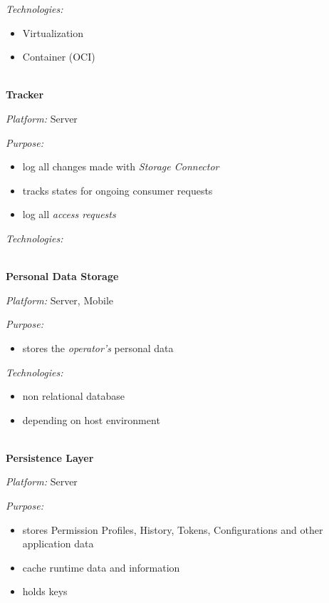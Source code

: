 \documentclass[12pt,english,a4paper,titlepage,cleardoublepage=empty,dottedtoc]{report}
\providecommand{\tightlist}{%
  \setlength{\itemsep}{0pt}\setlength{\parskip}{0pt}}
\begin{document}
\emph{Technologies:}

\begin{itemize}
\tightlist
\item
  Virtualization
\item
  Container (OCI)
\end{itemize}

~\\
\textbf{Tracker}

\emph{Platform:} Server

\emph{Purpose:}

\begin{itemize}
\tightlist
\item
  log all changes made with \emph{Storage Connector}
\item
  tracks states for ongoing consumer requests
\item
  log all \emph{access requests}
\end{itemize}

\emph{Technologies:}

~\\
\textbf{Personal Data Storage}

\emph{Platform:} Server, Mobile

\emph{Purpose:}

\begin{itemize}
\tightlist
\item
  stores the \emph{operator's} personal data
\end{itemize}

\emph{Technologies:}

\begin{itemize}
\tightlist
\item
  non relational database
\item
  depending on host environment
\end{itemize}

~\\
\textbf{Persistence Layer}

\emph{Platform:} Server

\emph{Purpose:}

\begin{itemize}
\tightlist
\item
  stores Permission Profiles, History, Tokens, Configurations and other
  application data
\item
  cache runtime data and information
\item
  holds keys
\end{itemize}
\end{document}
